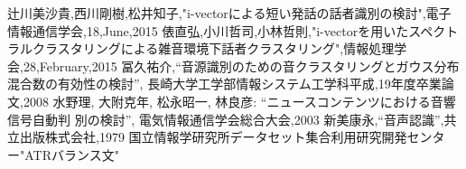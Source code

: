 \begin{thebibliography}{99}     %
辻川美沙貴,西川剛樹,松井知子,"i-vectorによる短い発話の話者識別の検討",電子情報通信学会,18,June,2015
俵直弘,小川哲司,小林哲則,"i-vectorを用いたスペクトラルクラスタリングによる雑音環境下話者クラスタリング",情報処理学会,28,February,2015
冨久祐介,“音源識別のための音クラスタリングとガウス分布混合数の有効性の検討”,
長崎大学工学部情報システム工学科平成,19年度卒業論文,2008
水野理, 大附克年, 松永昭一, 林良彦: “ニュースコンテンツにおける音響信号自動判
別の検討”, 電気情報通信学会総合大会,2003
新美康永,“音声認識”,共立出版株式会社,1979
国立情報学研究所データセット集合利用研究開発センター"ATRバランス文"
\end{thebibliography}

